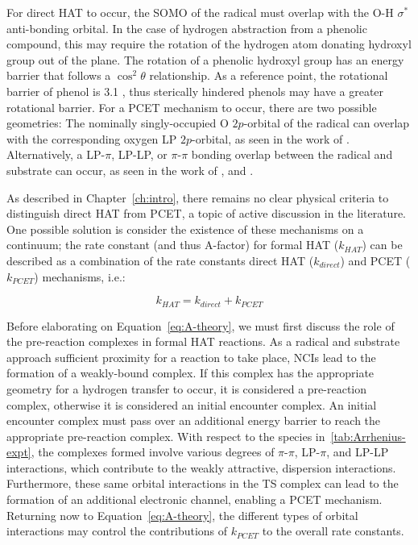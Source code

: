 \begin{doublespace}
For direct HAT to occur, the SOMO of the radical must overlap with the O-H
$\sigma^*$ anti-bonding orbital. In the case of hydrogen abstraction from a
phenolic compound, this may require the rotation of the hydrogen atom donating
hydroxyl group out of the plane. The rotation of a phenolic hydroxyl group has
an energy barrier that follows a $\cos^2 \theta$ relationship.\cite{Kojima1960}
As a reference point, the rotational barrier of phenol\cite{Kim1994} is 3.1
\kcalmol, thus sterically hindered phenols may have a greater rotational
barrier. For a PCET mechanism to occur, there are two possible geometries: The
nominally singly-occupied O $2p$-orbital of the radical can overlap with the
corresponding oxygen LP $2p$-orbital, as seen in the work of \citet{Mayer2002}.
Alternatively, a LP-$\pi$, LP-LP, or $\pi$-$\pi$ bonding overlap between the
radical and substrate can occur, as seen in the work of \citet{DiLabio2005}, and
\citet{DiLabio2007}.

As described in Chapter~\ref{ch:intro}, there remains no clear physical criteria
to distinguish direct HAT from PCET, a topic of active discussion in the
literature.\cite{Cukier1998, Mayer2002, Stubbe2003, Mayer2004, DiLabio2007,
Huynh2007, HammesSchiffer2008, Mayer2010, Weinberg2012, HammesSchiffer2015,
MunozRugeles2017} One possible solution is consider the existence of these
mechanisms on a continuum; the rate constant (and thus A-factor) for
formal HAT ($k_{HAT}$) can be described as a combination of the rate constants
direct HAT ($k_{direct}$) and PCET ($k_{PCET}$) mechanisms, i.e.:

\begin{equation}
  k_{HAT} = k_{direct} + k_{PCET}
  \label{eq:A-theory}
\end{equation}

Before elaborating on Equation~\ref{eq:A-theory}, we must first discuss the role
of the pre-reaction complexes in formal HAT reactions. As a radical and
substrate approach sufficient proximity for a reaction to take place, NCIs lead
to the formation of a weakly-bound complex. If this complex has the appropriate
geometry for a hydrogen transfer to occur, it is considered a pre-reaction
complex, otherwise it is considered an initial encounter complex. An initial
encounter complex must pass over an additional energy barrier to reach the
appropriate pre-reaction complex. With respect to the species
in~\ref{tab:Arrhenius-expt}, the complexes formed involve various degrees of
$\pi$-$\pi$, LP-$\pi$, and LP-LP interactions, which contribute to the weakly
attractive, dispersion interactions. Furthermore, these same orbital
interactions in the TS complex can lead to the formation of an additional
electronic channel, enabling a PCET mechanism.\cite{DiLabio2005, DiLabio2007}
Returning now to Equation~\ref{eq:A-theory}, the different types of orbital
interactions may control the contributions of $k_{PCET}$ to the overall rate
constants.


\end{doublespace}
